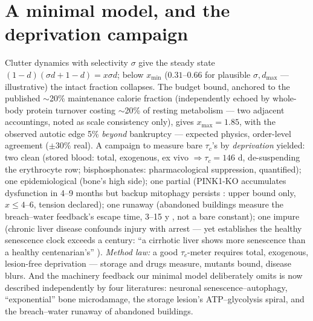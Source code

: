 \documentclass[11pt]{article}
\begin{document}
\section{A minimal model, and the deprivation campaign}
Clutter dynamics with selectivity $\sigma$ give the steady state
$(1-d)(\sigma d + 1 - d) = x \sigma d$; below $x_{\min}$ ($0.31$--$0.66$ for plausible
$\sigma, d_{\max}$ --- illustrative) the intact fraction collapses. The budget bound, anchored to
the published $\sim$20\% maintenance calorie fraction \cite{PMC636} (independently echoed by
whole-body protein turnover costing $\sim$20\% of resting metabolism \cite{Waterlow} --- two
adjacent accountings, noted as scale consistency only), gives $x_{\max} = 1.85$, with the
observed autotic edge 5\% \emph{beyond} bankruptcy --- expected physics, order-level agreement
($\pm 30$\% real). A campaign to measure bare $\tau_c$'s by \emph{deprivation} yielded: two clean
(stored blood: total, exogenous, ex vivo $\Rightarrow \tau_c = 146$ d, de-suspending the
erythrocyte row; bisphosphonates: pharmacological suppression, quantified); one epidemiological
(bone's high side); one partial (PINK1-KO accumulates dysfunction in 4--9 months \cite{PINK1KO}
but backup mitophagy persists \cite{eLife2018}: upper bound only, $x \le 4$--$6$, tension
declared); one runaway (abandoned buildings measure the breach--water feedback's escape time,
3--15 y \cite{Abandon}, not a bare constant); one impure (chronic liver disease confounds injury
with arrest --- yet establishes the healthy senescence clock exceeds a century: ``a cirrhotic
liver shows more senescence than a healthy centenarian's'' \cite{JHep2010}). \emph{Method law:}
a good $\tau_c$-meter requires total, exogenous, lesion-free deprivation --- storage and drugs
measure, mutants bound, disease blurs. And the machinery feedback our minimal model deliberately
omits is now described independently by four literatures: neuronal senescence--autophagy,
``exponential'' bone microdamage, the storage lesion's ATP--glycolysis spiral, and the
breach--water runaway of abandoned buildings.
\end{document}
